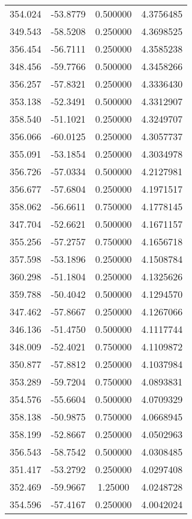 \documentclass{article}
\begin{document}
\begin{tabular}{| c | c | c | c |}
      354.024 &      -53.8779 &      0.500000 &        4.3756485\\
      349.543 &      -58.5208 &      0.250000 &        4.3698525\\
      356.454 &      -56.7111 &      0.250000 &        4.3585238\\
      348.456 &      -59.7766 &      0.500000 &        4.3458266\\
      356.257 &      -57.8321 &      0.250000 &        4.3336430\\
      353.138 &      -52.3491 &      0.500000 &        4.3312907\\
      358.540 &      -51.1021 &      0.250000 &        4.3249707\\
      356.066 &      -60.0125 &      0.250000 &        4.3057737\\
      355.091 &      -53.1854 &      0.250000 &        4.3034978\\
      356.726 &      -57.0334 &      0.500000 &        4.2127981\\
      356.677 &      -57.6804 &      0.250000 &        4.1971517\\
      358.062 &      -56.6611 &      0.750000 &        4.1778145\\
      347.704 &      -52.6621 &      0.500000 &        4.1671157\\
      355.256 &      -57.2757 &      0.750000 &        4.1656718\\
      357.598 &      -53.1896 &      0.250000 &        4.1508784\\
      360.298 &      -51.1804 &      0.250000 &        4.1325626\\
      359.788 &      -50.4042 &      0.500000 &        4.1294570\\
      347.462 &      -57.8667 &      0.250000 &        4.1267066\\
      346.136 &      -51.4750 &      0.500000 &        4.1117744\\
      348.009 &      -52.4021 &      0.750000 &        4.1109872\\
      350.877 &      -57.8812 &      0.250000 &        4.1037984\\
      353.289 &      -59.7204 &      0.750000 &        4.0893831\\
      354.576 &      -55.6604 &      0.500000 &        4.0709329\\
      358.138 &      -50.9875 &      0.750000 &        4.0668945\\
      358.199 &      -52.8667 &      0.250000 &        4.0502963\\
      356.543 &      -58.7542 &      0.500000 &        4.0308485\\
      351.417 &      -53.2792 &      0.250000 &        4.0297408\\
      352.469 &      -59.9667 &       1.25000 &        4.0248728\\
      354.596 &      -57.4167 &      0.250000 &        4.0042024\\
      \hline
\end{tabular}
\end{document}
